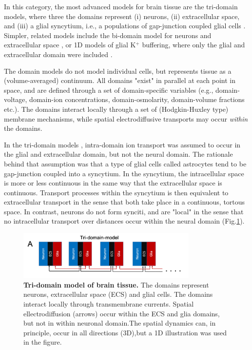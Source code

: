 In this category, the most advanced models for brain tissue are the tri-domain models, where three the domains represent (i) neurons, (ii) extracellular space, and (iii) a glial syncytium, i.e., a populations of gap-junction coupled glial cells \cite{OConnell2016, tuttle2019}. Simpler, related models include the bi-domain model for neurons and extracellular space \cite{Mori2015}, or 1D models of glial K$^+$ buffering, where only the glial and extracellular domain were included \cite{Gardner-Medwin1983, Chen2000, Halnes2013}.

The domain models do not model individual cells, but represents tissue as a (volume-averaged) continuum. All domains "exist" in parallel at each point in space, and are defined through a set of domain-specific variables (e.g., domain-voltage, domain-ion concentrations, domain-osmolarity, domain-volume fractions etc.). The domains interact locally through a set of (Hodgkin-Huxley type) membrane mechanisms, while spatial electrodiffusive transports may occur \textit{within} the domains. 

In the tri-domain models \cite{OConnell2016, tuttle2019}, intra-domain ion transport was assumed to occur in the glial and extracellular domain, but not the neural domain. The rationale behind that assumption was that a type of glial cells called astrocytes tend to be gap-junction coupled into a syncytium. In the syncytium, the intracellular space is more or less continuous in the same way that the extracellular space is continuous. Transport processes within the syncytium is then equivalent to extracellular transport in the sense that both take place in a continuous, tortous space. In contrast, neurons do not form synciti, and are "local" in the sense that no intracellular transport over distances occur within the neural domain (Fig.\ref{Schemes:fig:domainmodel}). 

\begin{figure}[!ht]
\begin{center}
\includegraphics[width=0.8\textwidth]{Figures/Schemes/Tridomain.png}
\end{center}
\caption{\textbf{Tri-domain model of brain tissue.} The domains represent neurons, extracellular space (ECS) and glial cells. The domains interact locally through transmembrane currents. Spatial ellectrodiffusion (arrows) occur within the ECS and glia domains, but not in within neuronal domain.The spatial dynamics can, in principle, occur in all directions (3D),but a 1D illustration was used in the figure. 
}
\label{Schemes:fig:domainmodel}
\end{figure}

